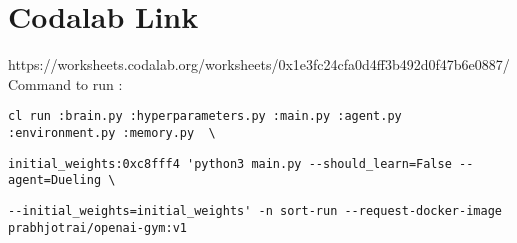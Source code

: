 \section{Codalab Link}
\label{sec:conclusion}

https://worksheets.codalab.org/worksheets/0x1e3fc24cfa0d4ff3b492d0f47b6e0887/
 \\
Command to run :\\

\begin{verbatim}
cl run :brain.py :hyperparameters.py :main.py :agent.py :environment.py :memory.py  \
\end{verbatim}
\begin{verbatim}
initial_weights:0xc8fff4 'python3 main.py --should_learn=False --agent=Dueling \
\end{verbatim}

\begin{verbatim}
--initial_weights=initial_weights' -n sort-run --request-docker-image prabhjotrai/openai-gym:v1
\end{verbatim}
